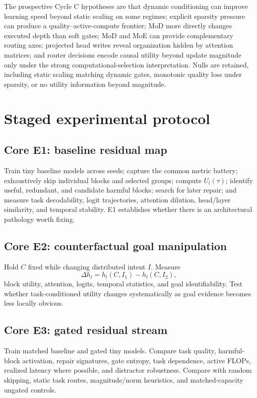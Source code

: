 \documentclass[10pt]{article}
\begin{document}
The prospective Cycle C hypotheses are that dynamic conditioning can improve learning speed beyond static scaling on some regimes; explicit sparsity pressure can produce a quality--active-compute frontier; MoD more directly changes executed depth than soft gates; MoD and MoE can provide complementary routing axes; projected head writes reveal organization hidden by attention matrices; and router decisions encode causal utility beyond update magnitude only under the strong computational-selection interpretation. Nulls are retained, including static scaling matching dynamic gates, monotonic quality loss under sparsity, or no utility information beyond magnitude.

\section{Staged experimental protocol}
\subsection{Core E1: baseline residual map}
Train tiny baseline models across seeds; capture the common metric battery; exhaustively skip individual blocks and selected groups; compute $U_l(\tau)$; identify useful, redundant, and candidate harmful blocks; search for later repair; and measure task decodability, logit trajectories, attention dilution, head/layer similarity, and temporal stability. E1 establishes whether there is an architectural pathology worth fixing.

\subsection{Core E2: counterfactual goal manipulation}
Hold $C$ fixed while changing distributed intent $I$. Measure
\[
\Delta h_l=h_l(C,I_1)-h_l(C,I_2),
\]
block utility, attention, logits, temporal statistics, and goal identifiability. Test whether task-conditioned utility changes systematically as goal evidence becomes less locally obvious.

\subsection{Core E3: gated residual stream}
Train matched baseline and gated tiny models. Compare task quality, harmful-block activation, repair signatures, gate entropy, task dependence, active FLOPs, realized latency where possible, and distractor robustness. Compare with random skipping, static task routes, magnitude/norm heuristics, and matched-capacity ungated controls.
\end{document}

